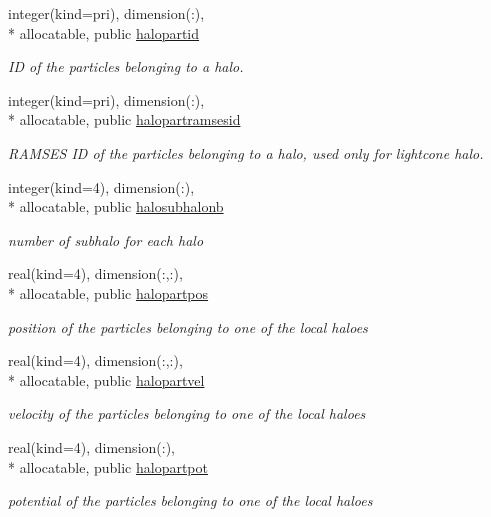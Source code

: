 \begin{DoxyCompactItemize}
integer(kind=pri), dimension(\-:), \\*
allocatable, public \hyperlink{classmodhalo_a2355dfa04d7ba9d48277d3f4d1e44a64}{halopartid}
\begin{DoxyCompactList}\small\item\em I\-D of the particles belonging to a halo. \end{DoxyCompactList}\item 
integer(kind=pri), dimension(\-:), \\*
allocatable, public \hyperlink{classmodhalo_a3c78e77057ed6c209d4081c8d559aed3}{halopartramsesid}
\begin{DoxyCompactList}\small\item\em R\-A\-M\-S\-E\-S I\-D of the particles belonging to a halo, used only for lightcone halo. \end{DoxyCompactList}\item 
integer(kind=4), dimension(\-:), \\*
allocatable, public \hyperlink{classmodhalo_a5dfc215badbd6aa90e9330266a673923}{halosubhalonb}
\begin{DoxyCompactList}\small\item\em number of subhalo for each halo \end{DoxyCompactList}\item 
real(kind=4), dimension(\-:,\-:), \\*
allocatable, public \hyperlink{classmodhalo_a92a746382aef848ff806f8eead8ca9e5}{halopartpos}
\begin{DoxyCompactList}\small\item\em position of the particles belonging to one of the local haloes \end{DoxyCompactList}\item 
real(kind=4), dimension(\-:,\-:), \\*
allocatable, public \hyperlink{classmodhalo_abd1eee90e1638db519b34633410ff9d1}{halopartvel}
\begin{DoxyCompactList}\small\item\em velocity of the particles belonging to one of the local haloes \end{DoxyCompactList}\item 
real(kind=4), dimension(\-:), \\*
allocatable, public \hyperlink{classmodhalo_a5d7a2e398703c4b5e5826d4e80638f6b}{halopartpot}
\begin{DoxyCompactList}\small\item\em potential of the particles belonging to one of the local haloes \end{DoxyCompactList}\item 

\end{DoxyCompactItemize}

